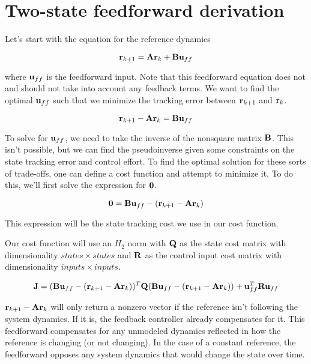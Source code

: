 \chapter{Two-state feedforward derivation} \label{ch:app-two-state-ff-deriv}

Let's start with the equation for the reference dynamics

\begin{equation*}
  \mathbf{r}_{k+1} = \mathbf{A}\mathbf{r}_k + \mathbf{B}\mathbf{u}_{ff}
\end{equation*}

where $\mathbf{u}_{ff}$ is the feedforward input. Note that this feedforward
equation does not and should not take into account any feedback terms. We want
to find the optimal $\mathbf{u}_{ff}$ such that we minimize the tracking error
between $\mathbf{r}_{k+1}$ and $\mathbf{r}_k$.

\begin{equation*}
  \mathbf{r}_{k+1} - \mathbf{A}\mathbf{r}_k = \mathbf{B}\mathbf{u}_{ff}
\end{equation*}

To solve for $\mathbf{u}_{ff}$, we need to take the inverse of the nonsquare matrix
$\mathbf{B}$. This isn't possible, but we can find the pseudoinverse given some
constraints on the state tracking error and control effort. To find the optimal
solution for these sorts of trade-offs, one can define a cost function and
attempt to minimize it. To do this, we'll first solve the expression for
$\mathbf{0}$.

\begin{equation*}
  \mathbf{0} = \mathbf{B}\mathbf{u}_{ff} - (\mathbf{r}_{k+1} - \mathbf{A}\mathbf{r}_k)
\end{equation*}

This expression will be the state tracking cost we use in our cost function.

Our cost function will use an $H_2$ norm with $\mathbf{Q}$ as the state cost matrix
with dimensionality $states \times states$ and $\mathbf{R}$ as the control input
cost matrix with dimensionality $inputs \times inputs$.

\begin{equation*}
  \mathbf{J} = (\mathbf{B}\mathbf{u}_{ff} - (\mathbf{r}_{k+1} - \mathbf{A}\mathbf{r}_k))^T \mathbf{Q}
    (\mathbf{B}\mathbf{u}_{ff} - (\mathbf{r}_{k+1} - \mathbf{A}\mathbf{r}_k)) +
    \mathbf{u}_{ff}^T\mathbf{R}\mathbf{u}_{ff}
\end{equation*}

\begin{remark}
  $\mathbf{r}_{k+1} - \mathbf{A}\mathbf{r}_k$ will only return a nonzero vector if the
  reference isn't following the system dynamics. If it is, the feedback
  controller already compensates for it. This feedforward compensates for any
  unmodeled dynamics reflected in how the reference is changing (or not
  changing). In the case of a constant reference, the feedforward opposes any
  system dynamics that would change the state over time.
\end{remark}

